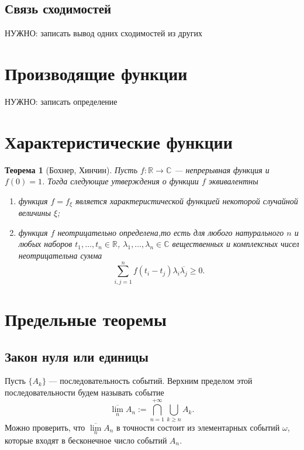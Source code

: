 \documentclass[12pt]{article}
\newtheorem{theorem}{Теорема}
\numberwithin{theorem}{section}
\theoremstyle{definition}
\newcommand{\defin}[2]{\hypertarget{#2}{{\color{red} #1}}}
\newcommand{\CC}{\mathbb{C}}
\newcommand{\RR}{\mathbb{R}}
\newcommand{\TODO}[1]{\textcolor{todocolor}{НУЖНО: #1}}
\begin{document}
	\subsection{Связь сходимостей}
	
	\TODO{записать вывод одних сходимостей из других}
	
	\section{Производящие функции}
	
	\TODO{записать определение}
	
	\section{Характеристические функции}
	
	\begin{theorem}[Бохнер, Хинчин]
		Пусть $ f \colon \RR \to \CC $ --- непрерывная функция и $ f(0) = 1 $.
		Тогда следующие утверждения о функции $ f $ эквивалентны
		\begin{enumerate}
			\item функция $ f = f_\xi $ является характеристической функцией некоторой случайной величины $ \xi $;
			\item функция $ f $ неотрицательно определена,то есть для любого натурального $ n $
			и любых наборов $ t_1, \ldots, t_n \in \RR $, $ \lambda_1, \ldots, \lambda_n \in \CC $
			вещественных и комплексных чисел неотрицательна
			сумма 
			$$ \sum\limits_{i,j = 1}^{n} f(t_i - t_j)\lambda_i\overline{\lambda_j} \geqslant 0. $$
		\end{enumerate}
	\end{theorem}
	
	\section{Предельные теоремы}
	
	\subsection{Закон нуля или единицы}
	
	Пусть $ \{A_k\} $ --- последовательность событий.
	\defin{Верхним пределом}{suplim} этой последовательности будем называть событие
	$$ \overline{\lim\limits_{n}} A_n := \bigcap\limits_{n = 1}^{+\infty} \bigcup\limits_{k \geqslant n} A_k. $$
	Можно проверить, что $ \overline{\lim\limits_{n}} A_n $ в точности состоит из элементарных событий $ \omega $,
	которые входят в бесконечное число событий $ A_n $.
	
\end{document}
